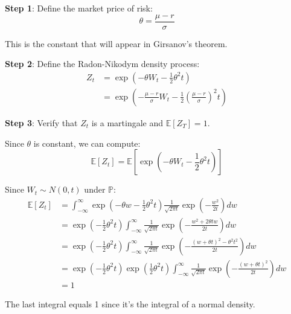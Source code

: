 \documentclass[
  letterpaper,
  DIV=11,
  numbers=noendperiod]{scrartcl}
\begin{document}
\begin{tcolorbox}[enhanced jigsaw, colback=white, rightrule=.15mm, coltitle=black, left=2mm, colframe=quarto-callout-note-color-frame, breakable, arc=.35mm, bottomtitle=1mm, toptitle=1mm, titlerule=0mm, leftrule=.75mm, colbacktitle=quarto-callout-note-color!10!white, title=\textcolor{quarto-callout-note-color}{\faInfo}\hspace{0.5em}{Proof of Theorem 3.1}, toprule=.15mm, opacitybacktitle=0.6, bottomrule=.15mm, opacityback=0]

\textbf{Step 1}: Define the market price of risk:
\[\theta = \frac{\mu - r}{\sigma}\]

This is the constant that will appear in Girsanov's theorem.

\textbf{Step 2}: Define the Radon-Nikodym density process: \begin{align}
Z_t &= \exp\left(-\theta W_t - \frac{1}{2}\theta^2 t\right) \\
&= \exp\left(-\frac{\mu - r}{\sigma} W_t - \frac{1}{2}\left(\frac{\mu - r}{\sigma}\right)^2 t\right)
\end{align}

\textbf{Step 3}: Verify that \(Z_t\) is a martingale and
\(\mathbb{E}[Z_T] = 1\).

Since \(\theta\) is constant, we can compute:
\[\mathbb{E}[Z_t] = \mathbb{E}\left[\exp\left(-\theta W_t - \frac{1}{2}\theta^2 t\right)\right]\]

Since \(W_t \sim N(0,t)\) under \(\mathbb{P}\): \begin{align}
\mathbb{E}[Z_t] &= \int_{-\infty}^{\infty} \exp\left(-\theta w - \frac{1}{2}\theta^2 t\right) \frac{1}{\sqrt{2\pi t}} \exp\left(-\frac{w^2}{2t}\right) dw \\
&= \exp\left(-\frac{1}{2}\theta^2 t\right) \int_{-\infty}^{\infty} \frac{1}{\sqrt{2\pi t}} \exp\left(-\frac{w^2 + 2\theta tw}{2t}\right) dw \\
&= \exp\left(-\frac{1}{2}\theta^2 t\right) \int_{-\infty}^{\infty} \frac{1}{\sqrt{2\pi t}} \exp\left(-\frac{(w + \theta t)^2 - \theta^2 t^2}{2t}\right) dw \\
&= \exp\left(-\frac{1}{2}\theta^2 t\right) \exp\left(\frac{1}{2}\theta^2 t\right) \int_{-\infty}^{\infty} \frac{1}{\sqrt{2\pi t}} \exp\left(-\frac{(w + \theta t)^2}{2t}\right) dw \\
&= 1
\end{align}

The last integral equals 1 since it's the integral of a normal density.


\end{tcolorbox}
\end{document}

